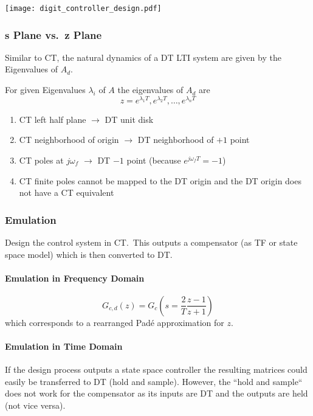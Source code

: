 \begin{center}
    \texttt{[image: digit\_controller\_design.pdf]}
\end{center}

\subsubsection{s Plane vs.\ z Plane}
Similar to CT, the natural dynamics of a DT LTI system are given by the Eigenvalues of $A_d$.

For given Eigenvalues $\lambda_i$ of $A$ the eigenvalues of $A_d$ are
\begin{equation*}
    z=e^{\lambda_1T},e^{\lambda_2T},\ldots,e^{\lambda_{n}T}
\end{equation*}

\begin{enumerate}
    \item CT left half plane $\rightarrow$ DT unit disk
    \item CT neighborhood of origin $\rightarrow$ DT neighborhood of $+1$ point
    \item CT poles at $j\omega_f$ $\rightarrow$ DT $-1$ point (because $e^{j\omega_{f}T}=-1$)
    \item CT finite poles cannot be mapped to the DT origin and the DT origin does not have a CT equivalent
\end{enumerate}

\subsubsection{Emulation}
Design the control system in CT.\ This outputs a compensator (as TF or state space model) which is then converted to DT.

\paragraph{Emulation in Frequency Domain}
\begin{equation*}
    G_{c,d}(z)=G_{c}\left(s=\frac2T\frac{z-1}{z+1}\right)
\end{equation*}
which corresponds to a rearranged Padé approximation for $z$.

\paragraph{Emulation in Time Domain}
If the design process outputs a state space controller the resulting matrices could easily be transferred to DT (hold and sample).
However, the ``hold and sample`` does not work for the compensator as its inputs are DT and the outputs are held (not vice versa).\\\\

